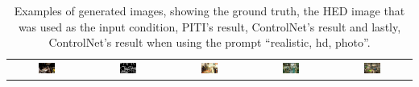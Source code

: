 \begin{table}[hbp]
{\begin{tabular}{c c c c c}
        \includegraphics[width=0.23\textwidth]{./assets/base_image_00066231.pdf} & \includegraphics[width=0.23\textwidth]{./assets/hed_image_00066231.pdf} & \includegraphics[width=0.23\textwidth]{./assets/piti_image_00066231.pdf} & \includegraphics[width=0.23\textwidth]{./assets/control_image_00066231.pdf} & \includegraphics[width=0.23\textwidth]{./assets/prompt_control_image_00066231.pdf}
    \end{tabular}
    }
    \caption{Examples of generated images, showing the ground truth, the HED image that was used as the input condition, PITI's result, ControlNet's result and lastly, ControlNet's result when using the prompt ``realistic, hd, photo''.}
    \label{tab:controlnet:example}
\end{table}

